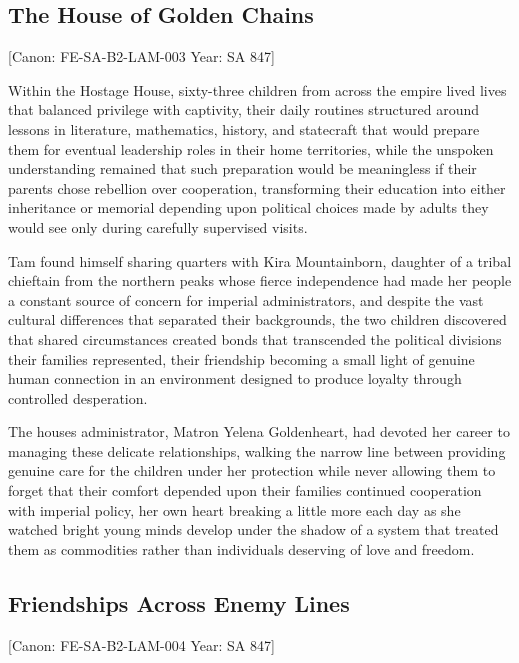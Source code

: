 \subsection{The House of Golden
Chains}\label{the-house-of-golden-chains}

{[}Canon: FE-SA-B2-LAM-003 \textbar{} Year: SA 847{]}

Within the Hostage House, sixty-three children from across the empire
lived lives that balanced privilege with captivity, their daily routines
structured around lessons in literature, mathematics, history, and
statecraft that would prepare them for eventual leadership roles in
their home territories, while the unspoken understanding remained that
such preparation would be meaningless if their parents chose rebellion
over cooperation, transforming their education into either inheritance
or memorial depending upon political choices made by adults they would
see only during carefully supervised visits.

Tam found himself sharing quarters with Kira Mountainborn, daughter of a
tribal chieftain from the northern peaks whose fierce independence had
made her people a constant source of concern for imperial
administrators, and despite the vast cultural differences that separated
their backgrounds, the two children discovered that shared circumstances
created bonds that transcended the political divisions their families
represented, their friendship becoming a small light of genuine human
connection in an environment designed to produce loyalty through
controlled desperation.

The house\textquotesingle s administrator, Matron Yelena Goldenheart,
had devoted her career to managing these delicate relationships, walking
the narrow line between providing genuine care for the children under
her protection while never allowing them to forget that their comfort
depended upon their families\textquotesingle{} continued cooperation
with imperial policy, her own heart breaking a little more each day as
she watched bright young minds develop under the shadow of a system that
treated them as commodities rather than individuals deserving of love
and freedom.

\subsection{Friendships Across Enemy
Lines}\label{friendships-across-enemy-lines}

{[}Canon: FE-SA-B2-LAM-004 \textbar{} Year: SA 847{]}

